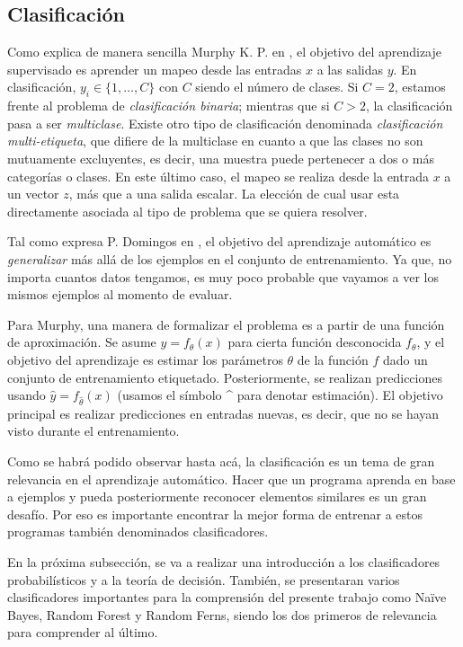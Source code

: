 \subsection{Clasificación}

		Como explica de manera sencilla Murphy K. P. en \cite{Murphy12}, el objetivo del aprendizaje supervisado es aprender un mapeo desde las entradas $x$ a las salidas $y$. En clasificación, $y_i \in \{1,\dots,C\}$ con $C$ siendo el número de clases. Si $C=2$, estamos frente al problema de \textit{clasificación binaria}; mientras que si $C>2$, la clasificación pasa a ser \textit{multiclase}. Existe otro tipo de clasificación denominada \textit{clasificación multi-etiqueta}, que difiere de la multiclase en cuanto a que las clases no son mutuamente excluyentes, es decir, una muestra puede pertenecer a dos o más categorías o clases. En este último caso, el mapeo se realiza desde la entrada $x$ a un vector $z$, más que a una salida escalar. La elección de cual usar esta directamente asociada al tipo de problema que se quiera resolver.
		
		Tal como expresa P. Domingos en \cite{PDomingo}, el objetivo del aprendizaje automático es \textit{generalizar} más allá de los ejemplos en el conjunto de entrenamiento. Ya que, no importa cuantos datos tengamos, es muy poco probable que vayamos a ver los mismos ejemplos al momento de evaluar.
		
		Para Murphy, una manera de formalizar el problema es a partir de una función de aproximación. Se asume $y = f_{\theta}(x)$ para cierta función desconocida $f_{\theta}$, y el objetivo del aprendizaje es estimar los parámetros $\theta$ de la función $f$ dado un conjunto de entrenamiento etiquetado. Posteriormente, se realizan predicciones usando $\hat{y} = f_{\hat{\theta}}(x)$ (usamos el símbolo \string^ para denotar estimación). El objetivo principal es realizar predicciones en entradas nuevas, es decir, que no se hayan visto durante el entrenamiento.
		
		Como se habrá podido observar hasta acá, la clasificación es un tema de gran relevancia en el aprendizaje automático. Hacer que un programa aprenda en base a ejemplos y pueda posteriormente reconocer elementos similares es un gran desafío. Por eso es importante encontrar la mejor forma de entrenar a estos programas también denominados clasificadores.
		
		En la próxima subsección, se va a realizar una introducción a los clasificadores probabilísticos y a la teoría de decisión. También, se presentaran varios clasificadores importantes para la comprensión del presente trabajo como Na\"{i}ve Bayes, Random Forest y Random Ferns, siendo los dos primeros de relevancia para comprender al último.
		
